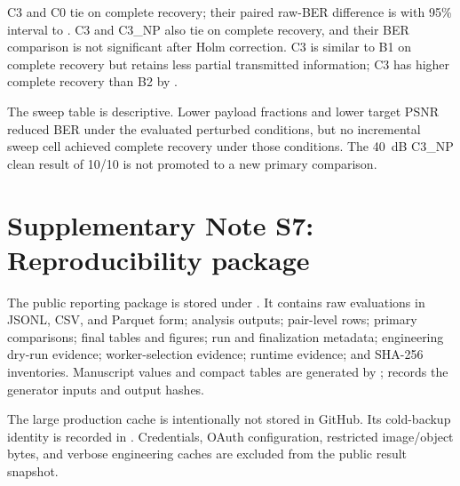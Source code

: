 \documentclass[10pt]{article}
\begin{document}
C3 and C0 tie on complete recovery; their paired raw-BER difference is \CThreeCZeroBERDiff{} with 95\% interval \CThreeCZeroBERCILow{} to \CThreeCZeroBERCIHigh{}. C3 and C3\_NP also tie on complete recovery, and their BER comparison is not significant after Holm correction. C3 is similar to B1 on complete recovery but retains less partial transmitted information; C3 has higher complete recovery than B2 by \CThreeBTwoCompleteDiff{}.




The sweep table is descriptive. Lower payload fractions and lower target PSNR reduced BER under the evaluated perturbed conditions, but no incremental sweep cell achieved complete recovery under those conditions. The 40~dB C3\_NP clean result of 10/10 is not promoted to a new primary comparison.

\section*{Supplementary Note S7: Reproducibility package}
The public reporting package is stored under . It contains raw evaluations in JSONL, CSV, and Parquet form; analysis outputs; pair-level rows; primary comparisons; final tables and figures; run and finalization metadata; engineering dry-run evidence; worker-selection evidence; runtime evidence; and SHA-256 inventories. Manuscript values and compact tables are generated by ;  records the generator inputs and output hashes.

The large production cache is intentionally not stored in GitHub. Its cold-backup identity is recorded in . Credentials, OAuth configuration, restricted image/object bytes, and verbose engineering caches are excluded from the public result snapshot.
\end{document}
